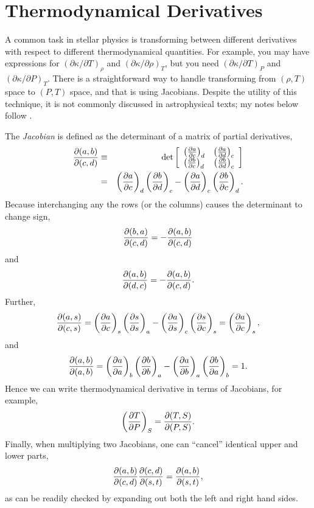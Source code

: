 \chapter{Thermodynamical Derivatives}
\label{s.thermo-derivatives}

A common task in stellar physics is transforming between different derivatives with respect to different thermodynamical quantities.  For example, you may have expressions for $(\partial \kappa/\partial T)_{\rho}$ and $(\partial \kappa/\partial \rho)_{T}$, but you need $(\partial\kappa/\partial T)_{P}$ and $(\partial\kappa/\partial P)_{T}$.  There is a straightforward way to handle transforming from $(\rho,T)$ space to $(P,T)$ space, and that is using Jacobians.  Despite the utility of this technique, it is not commonly discussed in astrophysical texts; my notes below follow \citet{landau80:_statis_physic}.

The \emph{Jacobian} is defined as the determinant of a matrix of partial derivatives,
\begin{eqnarray}
\frac{\partial(a,b)}{\partial(c,d)} &\equiv& \det\left[
	\begin{array}{lr}\left(\frac{\partial a}{\partial c}\right)_{d} & \left(\frac{\partial a}{\partial d}\right)_{c}\\
	\left(\frac{\partial b}{\partial c}\right)_{d} & \left(\frac{\partial b}{\partial d}\right)_{c} \end{array}\right] \nonumber \\
 & = & \left(\frac{\partial a}{\partial c}\right)_{d}\left(\frac{\partial b}{\partial d}\right)_{c} - \left(\frac{\partial a}{\partial d}\right)_{c}\left(\frac{\partial b}{\partial c}\right)_{d}.
 \end{eqnarray}
Because interchanging any the rows (or the columns) causes the determinant to change sign, 
\begin{equation}
\frac{\partial(b,a)}{\partial(c,d)} = -\frac{\partial(a,b)}{\partial(c,d)}
\end{equation}
and
\begin{equation}
\frac{\partial(a,b)}{\partial(d,c)} = -\frac{\partial(a,b)}{\partial(c,d)}.
\end{equation}
Further,
\begin{equation}
\frac{\partial(a,s)}{\partial(c,s)} = \left(\frac{\partial a}{\partial c}\right)_{s}\left(\frac{\partial s}{\partial s}\right)_{a} - \left(\frac{\partial a}{\partial s}\right)_{c}\left(\frac{\partial s}{\partial c}\right)_{s} = \left(\frac{\partial a}{\partial c}\right)_{s},
\end{equation}
and
\begin{equation}
\frac{\partial(a,b)}{\partial(a,b)} = \left(\frac{\partial a}{\partial a}\right)_{b}\left(\frac{\partial b}{\partial b}\right)_{a} - \left(\frac{\partial a}{\partial b}\right)_{a}\left(\frac{\partial b}{\partial a}\right)_{b} = 1.
\end{equation}
Hence we can write thermodynamical derivative in terms of Jacobians, for example,
\begin{equation}
\left(\frac{\partial T}{\partial P}\right)_{S} = \frac{\partial(T,S)}{\partial(P,S)}.
\end{equation}
Finally, when multiplying two Jacobians, one can ``cancel'' identical upper and lower parts,
\begin{equation}
\frac{\partial(a,b)}{\partial(c,d)}\frac{\partial(c,d)}{\partial(s,t)} =\frac{\partial(a,b)}{\partial(s,t)},
\end{equation}
as can be readily checked by expanding out both the left and right hand sides.

